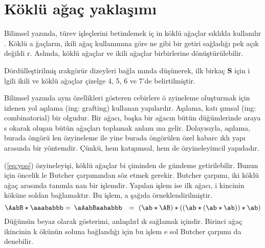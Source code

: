 \documentclass[a4paper,10pt]{article}
\begin{document}
\section{K\"okl\"u a\u{g}a\c{c} yakla\c{s}\i m{\i}}

Bilimsel yaz\i nda, t\"urev i\c{s}le\c{c}lerini betimlemek i\c{c}%
in k\"okl\"u a\u{g}a\c{c}lar s\i kl\i kla kul\-lan\i l\i r 
\cite{Munthe-Kaas2013}. K\"okl\"u a%
\u{g}a\c{c}lar\i n, ikili a\u{g}a\c{c} kullan\i m\i na g\"ore ne %
gibi bir getiri sa\u{g}lad\i \u{g}{\i} pek a\c{c}\i k de\u{g}ildi%
r. Asl\i nda, k\"okl\"u a\u{g}a\c{c}lar ve ikili a\u{g}a\c{c}lar %
birbirlerine d\"on\"u\c{s}t\"ur\"ulebilir. %

D\"ord\"ulle\c{s}tirilmi\c{s} \i rakg\"or\"ur dizeyleri ba\u{g}la%
m\i nda d\"u\c{s}\"unerek, ilk birka\c{c} $\mathbf{S}$ i\c{c}in i%
lgili ikili ve k\"okl\"u a\u{g}a\c{c}lar \c{c}izelge 4, 5, 6 ve %
7'de belirtilmi\c{s}tir. %

Bilimsel yaz\i nda ayn{\i} \"ozellikleri g\"osteren cebirlere \"o%
zyineleme olu\c{s}turmak i\c{c}in izlenen yol a\c{s}\i lama %
(ing: grafting) kullanan yap\i lard\i r. A\c{s}\i lama, kat{\i}%
\c{s}\i msal (ing: combinatorial) bir olgudur. Bir a\u{g}ac{\i}, %
ba\c{s}ka bir a\u{g}ac\i n b\"ut\"un d\"u\u{g}\"umlerinde araya s%
okarak olu\c{s}an b\"ut\"un a\u{g}a\c{c}lar{\i} toplamak anlam%
{\i}na gelir. Dolay\i s\i yla, a\c{s}\i lama, burada \"ong\"or\"u%
len \"ozyineleme ile yine burada \"ong\"or\"ulen \"ozel kabarc%
\i kl{\i} yap{\i} aras\i nda bir y\"ontemdir. \c{C}\"unk\"u, hem %
kat\i \c{s}\i msal, hem de \"ozyineleyimcil yap{\i}dad\i r. %

(\ref{eq:yoo}) \"ozyineleyi\c{s}i, k\"okl\"u a\u{g}a\c{c}lar bi%
\c{c}iminden de g\"undeme getirilebilir. Bunun i\c{c}in \"oncelik%
le Butcher \c{c}arp{\i}\-m\i n\-dan s\"oz etmek gerekir. Butcher %
\c{c}arp\i m{\i}, iki k\"okl\"u a\u{g}a\c{c} aras\i nda tan\i mla%
nan bir i\c{s}lemdir. Yap\i lan i\c{s}lem ise ilk a\u{g}ac{\i}, i%
kincinin k\"ok\"une soldan ba\u{g}lamakt\i r. Bu i\c{s}lem, a%
\c{s}a\u{g}\i da \"orneklendirilmi\c{s}tir. %
\begin{equation}
 \AabB \star \aaababbb = \, \aAabBaababbb \ \ =\  
 (\ab\star\AB)\star((\ab\star(\ab\star\ab))\star\ab) 
\end{equation}
D\"u\u{g}\"um\"un beyaz olarak g\"osterimi, anla\c{s}\i l\i rl%
\i k sa\u{g}lamak i\c{c}indir. Birinci a\u{g}a\c{c} ikincinin k%
\"ok\"un\"un soluna ba\u{g}land\i \u{g}{\i} i\c{c}in bu i\c{s}lem%
e sol Butcher \c{c}arp\i m{\i} da denebilir. %
\end{document}
